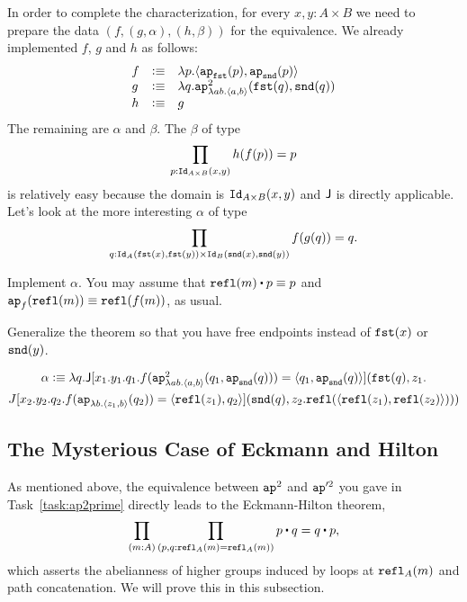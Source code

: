 \documentclass[12pt]{article}
\newcommand{\cut}[1]{}
\newcommand{\marksolution}[1]{\color{FireBrick}#1\normalcolor}%
\newcommand{\marksolution}[1]{\cut{#1}}%
\newenvironment{solution}{\trivlist \item[\hskip \labelsep{\bf
Solution:}]}{\endtrivlist}
\begin{document}
In order to complete the characterization, for every $x,y : A \times B$
we need to prepare the data $(f,(g,\alpha),(h,\beta))$ for the equivalence.
We already implemented $f$, $g$ and $h$ as follows:
\[
  \begin{array}{lcl}
    f &\vcentcolon\equiv& \lambda p.\langle \mathtt{ap}_{\mathtt{fst}}(p),\mathtt{ap}_{\mathtt{snd}}(p)\rangle
    \\
    g &\vcentcolon\equiv& \lambda q.\mathtt{ap}^2_{\lambda ab.\langle a,b\rangle}(\mathtt{fst}(q),\mathtt{snd}(q))
    \\
    h &\vcentcolon\equiv& g
  \end{array}
\]
The remaining are $\alpha$ and $\beta$. The $\beta$ of type
\[
  \prod_{p : \mathtt{Id}_{A\times B}(x,y)} h(f(p)) = p
\]
is relatively easy because the domain is $\mathtt{Id}_{A\times B}(x,y)$
and $\mathsf{J}$ is directly applicable.
Let's look at the more interesting $\alpha$ of type
\[
  \prod_{q : \mathtt{Id}_{A}(\mathtt{fst}(x),\mathtt{fst}(y)) \times \mathtt{Id}_B(\mathtt{snd}(x),\mathtt{snd}(y))} f(g(q)) = q.
\]
\begin{task}
  Implement $\alpha$.
  You may assume that $\refl(m) \concat p \jdeq p$ and $\mathtt{ap}_f(\mathtt{refl}(m)) \equiv \mathtt{refl}(f(m))$,
  as usual.
  \begin{hint}
    Generalize the theorem
    so that you have free endpoints instead of $\mathtt{fst}(x)$ or $\mathtt{snd}(y)$.
  \end{hint}
\end{task}
\marksolution{
  \begin{solution}
    \begin{multline*}
      \textstyle
      \alpha \vcentcolon\equiv \lambda q.\mathsf{J}[x_1.y_1.q_1.
        f(\mathtt{ap}^2_{\lambda ab.\langle a,b\rangle}(q_1,\mathtt{ap}_{\mathtt{snd}}(q))) = \langle q_1,\mathtt{ap}_{\mathtt{snd}}(q)\rangle
      ](\mathtt{fst}(q),z_1.
      \\
      J[x_2.y_2.q_2. f(\mathtt{ap}_{\lambda b.\langle z_1,b\rangle}(q_2)) = \langle \mathtt{refl}(z_1),q_2\rangle]
      (\mathtt{snd}(q),
      z_2.\mathtt{refl}(\langle \mathtt{refl}(z_1),\mathtt{refl}(z_2)\rangle)))
      \end{multline*}
  \end{solution}
}

\subsection{The Mysterious Case of Eckmann and Hilton}

As mentioned above, the equivalence between $\mathtt{ap}^2$
and $\mathtt{ap}'^2$ you gave in Task~\ref{task:ap2prime}
directly leads to the Eckmann-Hilton theorem,
\[
  \prod_{(m{:}A)}\prod_{(p,q{:}\refl_A(m)=\refl_A(m))}p\concat q = q\concat p,
\]
which asserts the abelianness of higher groups
induced by loops at $\mathtt{refl}_A(m)$ and path concatenation.
We will prove this in this subsection.
\end{document}
